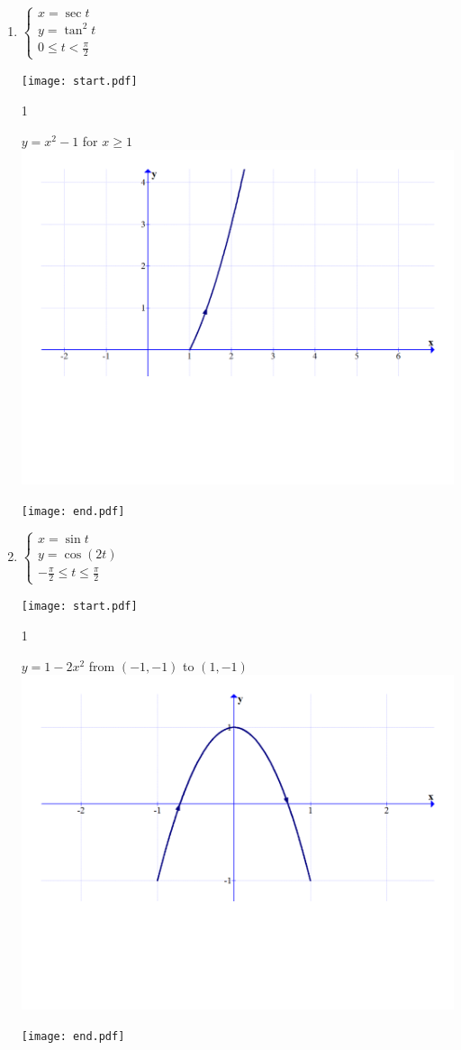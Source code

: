 \documentclass[12pt]{article}
\begin{document}
\begin{enumerate}
\item $\left\{\begin{array}{l}
x=\sec{t}\\
y=\tan^2{t}\\
0 \leq t < \frac{\pi}{2} \end{array} \right.$

\texttt{[image: start.pdf]}
{{{1\linewidth}{\begin{center}
$y=x^2-1$ for $x \geq 1$\\
\includegraphics[scale=0.25]{ans4.pdf}
\end{center}}}}
\texttt{[image: end.pdf]}


\item $\left\{\begin{array}{l}
x=\sin{t}\\
y=\cos{(2t)}\\
-\frac{\pi}{2} \leq t \leq \frac{\pi}{2} \end{array} \right.$

\texttt{[image: start.pdf]}
{{{1\linewidth}{\begin{center}
$y=1-2x^2$ from $(-1,-1)$ to $(1,-1)$\\
\includegraphics[scale=0.25]{ans5.pdf}\end{center}}}}
\texttt{[image: end.pdf]}



\end{enumerate}
\end{document}
